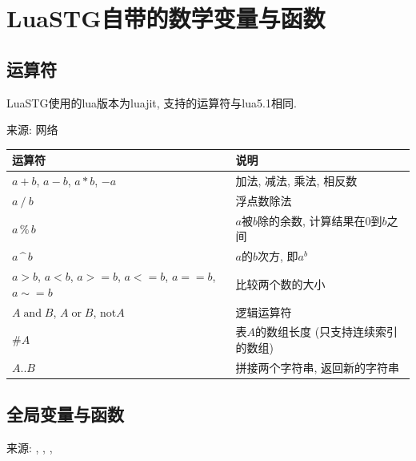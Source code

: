 \chapter{LuaSTG自带的数学变量与函数} \label{sec:lstg-math}

\section{运算符}

LuaSTG使用的lua版本为luajit,
支持的运算符与lua5.1相同.

来源: 网络

\begin{center}
  \begin{xltabular}{\textwidth}{XX}
    \toprule
    运算符           & 说明                           \\
    \midrule
    {
      $a+b$, $a-b$, $a*b$, $-a$
    }                & {
        加法, 减法, 乘法, 相反数
      }                                                 \\
    $a\mathbin{/}b$  & 浮点数除法                     \\
    $a\mathbin{\%}b$ & {
        $a$被$b$除的余数, 计算结果在0到$b$之间
      }                                                 \\
    {
    $a\mathbin{\text{\textasciicircum}}b$
    }                & {
        $a$的$b$次方, 即$a^b$
      }                                                 \\
    {
    $a>b$, $a<b$, $a>=b$, $a<=b$, $a==b$,
    $a\sim=b$
    }                & 比较两个数的大小               \\
    {
    $A\mathbin{\text{and}}B$,
    $A\mathbin\text{or}B$,
    $\mathbin{\text{not}}A$
    }                & 逻辑运算符                     \\
    $\#A$            & {
        表$A$的数组长度 (只支持连续索引的数组)
      }                                                 \\
    $A\mathbin{..}B$ & 拼接两个字符串, 返回新的字符串 \\
    \bottomrule
  \end{xltabular}
\end{center}

\section{全局变量与函数}

来源: , ,
, 

